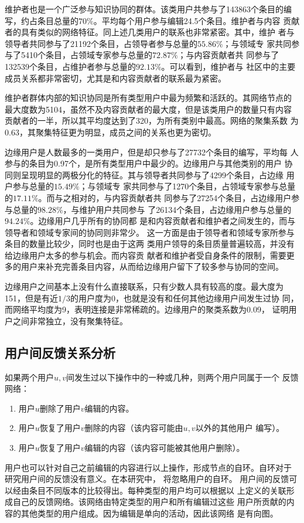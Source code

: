 维护者也是一个广泛参与知识协同的群体。该类用户共参与了143863个条目的编
写，约占条目总量的$70\%$。平均每个用户参与编辑24.5个条目。维护者与内容
贡献者的具有类似的网络特征。同上述几类用户的联系也非常紧密。其中，维护
者与领导者共同参与了21192个条目，占领导者参与总量的$55.86\%$；与领域专
家共同参与了5410个条目，占领域专家参与总量的$72.87\%$；与内容贡献者共
同参与了132539个条目，占维护者参与总量的$92.13\%$。可以看到，维护者与
社区中的主要成员关系都非常密切，尤其是和内容贡献者的联系最为紧密。

维护者群体内部的知识协同是所有类型用户中最为频繁和活跃的。其网络节点的
最大度数为5104，虽然不及内容贡献者的最大度，但是该类用户的数量只有内容
贡献者的一半，所以其平均度达到了320，为所有类别中最高。网络的聚集系数
为0.63，其聚集特征更为明显，成员之间的关系也更为密切。

边缘用户是人数最多的一类用户，但是却只参与了27732个条目的编写，平均每
人参与的条目为0.97个，是所有类型用户中最少的。边缘用户与其他类别的用户
协同则呈现明显的两极分化的特征。其与领导者共同参与了4299个条目，占边缘
用户参与总量的$15.49\%$；与领域专
家共同参与了1270个条目，占领域专家参与总量的$17.11\%$。而与之相对的，与内容贡献者共
同参与了27254个条目，占边缘用户参与总量的$98.28\%$，与维护用户共同参与
了26134个条目，占边缘用户参与总量的$94.24\%$。边缘用户几乎所有的协同都
是和内容贡献者和维护者之间发生的，而与领导者和领域专家间的协同则非常少。
这一方面是由于领导者和领域专家所参与条目的数量比较少，同时也是由于这两
类用户领导的条目质量普遍较高，并没有给边缘用户太多的参与机会。而内容贡
献者和维护者受自身条件的限制，需要更多的用户来补充完善条目内容，从而给边缘用户留下了较多参与协同的空间。

边缘用户之间基本上没有什么直接联系，只有少数人具有较高的度。最大度为
151，但是有近$1/3$的用户度为0，也就是没有和任何其他边缘用户间发生过协
同，而网络平均度为9，表明连接是非常稀疏的。边缘用户的聚类系数为0.09，
证明用户之间非常独立，没有聚集特征。

\subsection{用户间反馈关系分析}
如果两个用户$u,v$间发生过以下操作中的一种或几种，则两个用户同属于一个
反馈网络：
\begin{enumerate}
\item 用户$u$删除了用户$v$编辑的内容。
\item 用户$u$恢复了用户$v$删除的内容（该内容可能由$u,v$以外的其他用户
  编写）。
\item 用户$u$恢复了用户$v$编辑的内容（该内容可能被其他用户删除）。
\end{enumerate}
用户也可以针对自己之前编辑的内容进行以上操作，形成节点的自环。自环对于
研究用户间的反馈没有意义。在本研究中，
将忽略用户的自环。
用户间的反馈可以经由条目不同版本的比较得出。每种类型的用户均可以根据以
上定义的关联形成自己的反馈网络。该网络由特定类型的用户和所有编辑过这些
用户所贡献的内容的其他类型的用户组成。因为编辑是单向的活动，因此该网络
是有向图。

